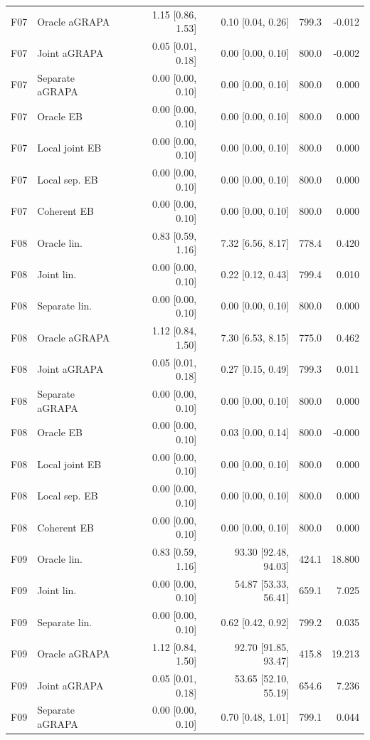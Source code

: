 \begin{longtable}{llrrrr}
F07 & Oracle aGRAPA & 1.15 [0.86, 1.53] & 0.10 [0.04, 0.26] & 799.3 & -0.012\\
F07 & Joint aGRAPA & 0.05 [0.01, 0.18] & 0.00 [0.00, 0.10] & 800.0 & -0.002\\
F07 & Separate aGRAPA & 0.00 [0.00, 0.10] & 0.00 [0.00, 0.10] & 800.0 & 0.000\\
F07 & Oracle EB & 0.00 [0.00, 0.10] & 0.00 [0.00, 0.10] & 800.0 & 0.000\\
F07 & Local joint EB & 0.00 [0.00, 0.10] & 0.00 [0.00, 0.10] & 800.0 & 0.000\\
F07 & Local sep. EB & 0.00 [0.00, 0.10] & 0.00 [0.00, 0.10] & 800.0 & 0.000\\
F07 & Coherent EB & 0.00 [0.00, 0.10] & 0.00 [0.00, 0.10] & 800.0 & 0.000\\
F08 & Oracle lin. & 0.83 [0.59, 1.16] & 7.32 [6.56, 8.17] & 778.4 & 0.420\\
F08 & Joint lin. & 0.00 [0.00, 0.10] & 0.22 [0.12, 0.43] & 799.4 & 0.010\\
F08 & Separate lin. & 0.00 [0.00, 0.10] & 0.00 [0.00, 0.10] & 800.0 & 0.000\\
F08 & Oracle aGRAPA & 1.12 [0.84, 1.50] & 7.30 [6.53, 8.15] & 775.0 & 0.462\\
F08 & Joint aGRAPA & 0.05 [0.01, 0.18] & 0.27 [0.15, 0.49] & 799.3 & 0.011\\
F08 & Separate aGRAPA & 0.00 [0.00, 0.10] & 0.00 [0.00, 0.10] & 800.0 & 0.000\\
F08 & Oracle EB & 0.00 [0.00, 0.10] & 0.03 [0.00, 0.14] & 800.0 & -0.000\\
F08 & Local joint EB & 0.00 [0.00, 0.10] & 0.00 [0.00, 0.10] & 800.0 & 0.000\\
F08 & Local sep. EB & 0.00 [0.00, 0.10] & 0.00 [0.00, 0.10] & 800.0 & 0.000\\
F08 & Coherent EB & 0.00 [0.00, 0.10] & 0.00 [0.00, 0.10] & 800.0 & 0.000\\
F09 & Oracle lin. & 0.83 [0.59, 1.16] & 93.30 [92.48, 94.03] & 424.1 & 18.800\\
F09 & Joint lin. & 0.00 [0.00, 0.10] & 54.87 [53.33, 56.41] & 659.1 & 7.025\\
F09 & Separate lin. & 0.00 [0.00, 0.10] & 0.62 [0.42, 0.92] & 799.2 & 0.035\\
F09 & Oracle aGRAPA & 1.12 [0.84, 1.50] & 92.70 [91.85, 93.47] & 415.8 & 19.213\\
F09 & Joint aGRAPA & 0.05 [0.01, 0.18] & 53.65 [52.10, 55.19] & 654.6 & 7.236\\
F09 & Separate aGRAPA & 0.00 [0.00, 0.10] & 0.70 [0.48, 1.01] & 799.1 & 0.044\\

\end{longtable}
